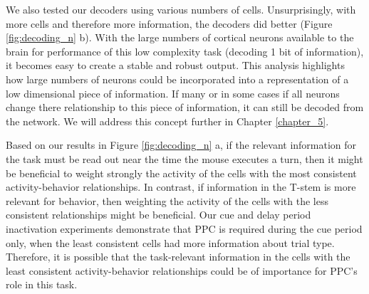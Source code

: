 \bigskip

We also tested our decoders using various numbers of cells. Unsurprisingly, with more cells and therefore more information, the decoders did better (Figure \ref{fig:decoding_n} b). With the large numbers of cortical neurons available to the brain for performance of this low complexity task (decoding 1 bit of information), it becomes easy to create a stable and robust output. This analysis highlights how large numbers of neurons could be incorporated into a representation of a low dimensional piece of information. If many or in some cases if all neurons change there relationship to this piece of information, it can still be decoded from the network. We will address this concept further in Chapter \ref{chapter_5}.

\bigskip

Based on our results in Figure \ref{fig:decoding_n} a, if the relevant information for the task must be read out near the time the mouse executes a turn, then it might be beneficial to weight strongly the activity of the cells with the most consistent activity-behavior relationships. In contrast, if information in the T-stem is more relevant for behavior, then weighting the activity of the cells with the less consistent relationships might be beneficial. Our cue and delay period inactivation experiments demonstrate that PPC is required during the cue period only, when the least consistent cells had more information about trial type. Therefore, it is possible that the task-relevant information in the cells with the least consistent activity-behavior relationships could be of importance for PPC's role in this task.

\bigskip

